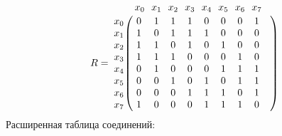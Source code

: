 \documentclass{article}
\begin{document}
\begin{figure}[h!]
\end{figure}
$$
R =
\bordermatrix{ & x_{0} \!&\! x_{1} \!&\! x_{2} \!&\! x_{3} \!&\! x_{4} \!&\! x_{5} \!&\! x_{6} \!&\! x_{7} \!&\! \cr 
x_{0} \!&\! 0 \!&\! 1 \!&\! 1 \!&\! 1 \!&\! 0 \!&\! 0 \!&\! 0 \!&\! 1 \!&\! \cr
x_{1} \!&\! 1 \!&\! 0 \!&\! 1 \!&\! 1 \!&\! 1 \!&\! 0 \!&\! 0 \!&\! 0 \!&\! \cr
x_{2} \!&\! 1 \!&\! 1 \!&\! 0 \!&\! 1 \!&\! 0 \!&\! 1 \!&\! 0 \!&\! 0 \!&\! \cr
x_{3} \!&\! 1 \!&\! 1 \!&\! 1 \!&\! 0 \!&\! 0 \!&\! 0 \!&\! 1 \!&\! 0 \!&\! \cr
x_{4} \!&\! 0 \!&\! 1 \!&\! 0 \!&\! 0 \!&\! 0 \!&\! 1 \!&\! 1 \!&\! 1 \!&\! \cr
x_{5} \!&\! 0 \!&\! 0 \!&\! 1 \!&\! 0 \!&\! 1 \!&\! 0 \!&\! 1 \!&\! 1 \!&\! \cr
x_{6} \!&\! 0 \!&\! 0 \!&\! 0 \!&\! 1 \!&\! 1 \!&\! 1 \!&\! 0 \!&\! 1 \!&\! \cr
x_{7} \!&\! 1 \!&\! 0 \!&\! 0 \!&\! 0 \!&\! 1 \!&\! 1 \!&\! 1 \!&\! 0 \!&\! \cr
}$$
Расширенная таблица соединений:
\end{document}

